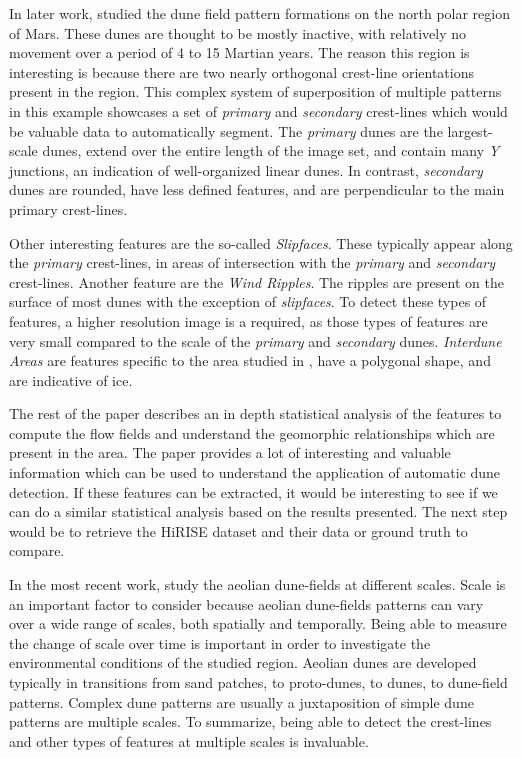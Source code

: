In later work, \cite{Ewing_Peyret_Kocurek_Bourke} studied the dune field pattern formations on the north polar region of Mars. These dunes are thought to be mostly inactive, with relatively no movement over a period of 4 to 15 Martian years. The reason this region is interesting is because there are two nearly orthogonal crest-line orientations present in the region. This complex system of superposition of multiple patterns in this example showcases a set of \emph{primary} and \emph{secondary} crest-lines which would be valuable data to automatically segment. The \emph{primary}	dunes are the largest-scale dunes, extend over the entire length of the image set, and contain many \emph{Y} junctions, an indication of well-organized linear dunes. In contrast, \emph{secondary} dunes are rounded, have less defined features, and are perpendicular to the main primary crest-lines.

Other interesting features are the so-called \emph{Slipfaces}. These typically appear along the \emph{primary} crest-lines, in areas of intersection with the \emph{primary} and \emph{secondary} crest-lines. Another feature are the \emph{Wind Ripples}. The ripples are present on the surface of most dunes with the exception	of \emph{slipfaces}. To detect	these types of features, a higher resolution image is a required, as those types of features are very small compared to the scale of the \emph{primary} and \emph{secondary}	dunes. \emph{Interdune Areas} are features specific to the area studied in \cite{Ewing_Peyret_Kocurek_Bourke},	have a polygonal shape, and are indicative of ice.

The rest of the paper describes an in depth statistical analysis of the features to compute the flow fields and understand the geomorphic relationships which are present in the area. The paper \cite{Ewing_Peyret_Kocurek_Bourke} provides a lot of interesting and valuable information which can be used to understand the application of automatic dune detection. If these features can be extracted, it would be interesting to see if we can do a similar statistical analysis based on the results presented. The next step would be to retrieve the HiRISE dataset and their data or ground truth to compare.

In the most recent work, \cite{Multi_spatial_analysis_aeolian_dune_field_patterns} study the aeolian dune-fields at different scales. Scale is an important factor to consider because aeolian dune-fields patterns can vary over	a wide range of scales, both spatially and temporally. Being able to measure the change of scale over time is important in order to investigate the environmental conditions of the studied region. Aeolian	dunes are developed typically in transitions from sand patches, to proto-dunes, to dunes, to dune-field patterns. Complex dune patterns are usually a juxtaposition of simple dune patterns are multiple scales. To summarize, being able to detect the crest-lines and other types of features at multiple scales is invaluable.

